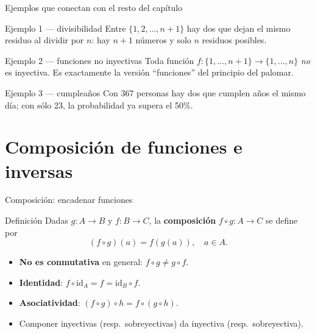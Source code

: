 \documentclass[10pt,xcolor=dvipsnames]{beamer}
\begin{document}
\begin{frame}{Ejemplos que conectan con el resto del capítulo}
  \begin{exampleblock}{Ejemplo 1 — divisibilidad}
    Entre $\{1,2,\dots,n+1\}$ hay dos que dejan el mismo residuo al dividir
    por $n$: hay $n+1$ números y solo $n$ residuos posibles.
  \end{exampleblock}

  \begin{exampleblock}{Ejemplo 2 — funciones no inyectivas}
    Toda función $f : \{1,\dots,n+1\} \to \{1,\dots,n\}$ \emph{no} es inyectiva.
    Es exactamente la versión ``funciones'' del principio del palomar.
  \end{exampleblock}

  \begin{exampleblock}{Ejemplo 3 — cumpleaños}
    Con 367 personas hay dos que cumplen años el mismo día;
    con sólo 23, la probabilidad ya supera el 50\%.
  \end{exampleblock}
\end{frame}





\section{Composición de funciones e inversas}

\begin{frame}{Composición: encadenar funciones}
  \begin{block}{Definición}
    Dadas $g : A \to B$ y $f : B \to C$, la \textbf{composición} $f \circ g :
    A \to C$ se define por
    \[
      (f \circ g)(a) = f(g(a)), \quad a \in A.
    \]
  \end{block}

  \begin{itemize}
    \item \textbf{No es conmutativa} en general: $f \circ g \neq g \circ f$.
    \item \textbf{Identidad}: $f \circ \mathrm{id}_A = f = \mathrm{id}_B \circ f$.
    \item \textbf{Asociatividad}: $(f \circ g) \circ h = f \circ (g \circ h)$.
    \item Componer inyectivas (resp.\ sobreyectivas) da inyectiva (resp.\ sobreyectiva).
  \end{itemize}
\end{frame}
\end{document}
